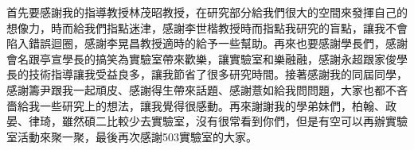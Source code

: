 \begin{acknowledgementsCH}

首先要感謝我的指導教授林茂昭教授，在研究部分給我們很大的空間來發揮自己的想像力，時而給我們指點迷津，感謝李世楷教授時而指點我研究的盲點，讓我不會陷入錯誤迴圈，感謝李晃昌教授適時的給予一些幫助。再來也要感謝學長們，感謝會名跟亭宣學長的搞笑為實驗室帶來歡樂，讓實驗室和樂融融，感謝永超跟家俊學長的技術指導讓我受益良多，讓我節省了很多研究時間。接著感謝我的同屆同學，感謝籌尹跟我一起頑皮、感謝得生帶來話題、感謝薏如給我問問題，大家也都不吝嗇給我一些研究上的想法，讓我覺得很感動。再來謝謝我的學弟妹們，柏翰、政晏、律琦，雖然碩二比較少去實驗室，沒有很常看到你們，但是有空可以再辦實驗室活動來聚一聚，最後再次感謝503實驗室的大家。

\end{acknowledgementsCH}